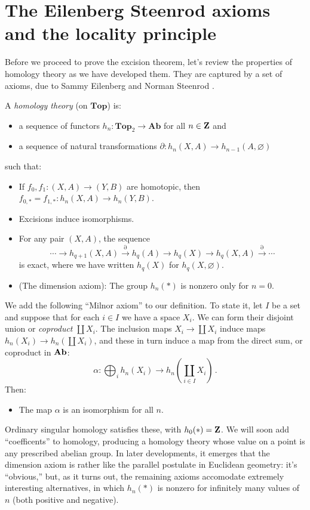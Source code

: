 \section{The Eilenberg Steenrod axioms and the locality principle}


Before we proceed to prove the excision theorem, let's review the properties of homology theory as we have developed them. They are captured by a set of axioms, due to Sammy Eilenberg and Norman Steenrod \cite{eilenberg-steenrod}. 
\begin{definition}
A {\em homology theory} (on $\mathbf{Top}$) is:
\begin{itemize}
\item a sequence of functors $h_n:\mathbf{Top}_2\to\mathbf{Ab}$ for all $n\in\mathbf Z$ and
\item a sequence of natural transformations $\partial:h_n(X,A)\to h_{n-1}(A,\varnothing)$
\end{itemize}
such that:
\begin{itemize}
\item If $f_0,f_1:(X,A)\to (Y,B)$ are homotopic, then $f_{0,\ast}=f_{1,\ast}:h_n(X,A)\to h_n(Y,B)$.
\item Excisions induce isomorphisms.
\item For any pair $(X,A)$, the sequence 
\begin{equation*}
\cdots\to h_{q+1}(X,A)\xrightarrow{\partial}h_q(A)\to h_q(X)\to h_q(X,A)\xrightarrow{\partial}\cdots
\end{equation*}
is exact, where we have written $h_q(X)$ for $h_q(X,\varnothing)$.
\item (The dimension axiom): The group $h_n(\ast)$ is nonzero only for $n=0$. 
\end{itemize}
\end{definition}
We add the following ``Milnor axiom'' \cite{milnor}
to our definition. To state it,
let $I$ be a set and suppose that for each $i\in I$ we have a space $X_i$. We can form their disjoint union or {\em coproduct} $\coprod X_i$. The inclusion maps $X_i\to\coprod X_i$ induce maps $h_n(X_i)\to h_n(\coprod X_i)$, and these in turn induce a map from the direct sum, or coproduct in $\mathbf{Ab}$:
\[
\alpha:\bigoplus_i h_n(X_i)\to h_n\left(\coprod_{i\in I} X_i\right)\,.
\]
Then:
\begin{itemize}
\item The map $\alpha$ is an isomorphism for all $n$.
\end{itemize}

Ordinary singular homology satisfies these, with $h_0(\ast)=\mathbf Z$. We will soon add ``coefficents'' to homology, producing a homology theory whose value on a point is any prescribed abelian group. In later developments, it 
emerges that the dimension axiom is rather like the parallel postulate
in Euclidean geometry: it's ``obvious,'' but, as it turns out, the remaining
axioms accomodate extremely interesting alternatives, in which
$h_n(*)$ is nonzero for infinitely many values of $n$ (both positive and negative). 

